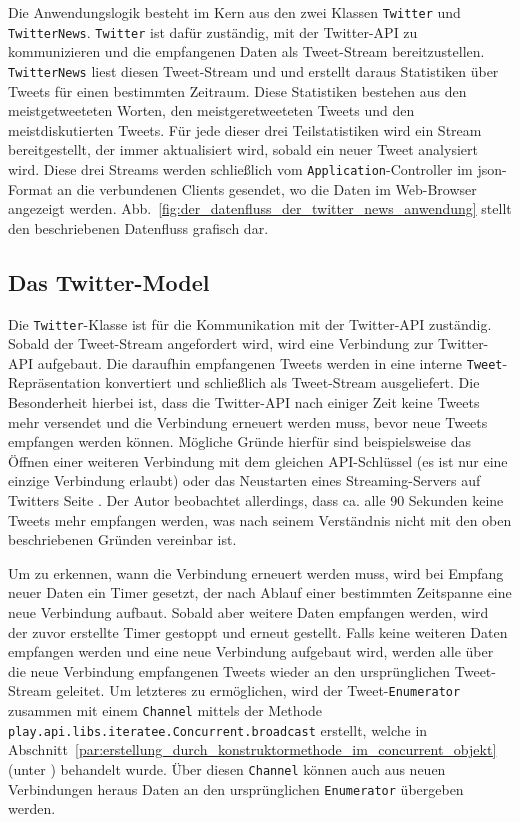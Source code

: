 Die Anwendungslogik besteht im Kern aus den zwei Klassen \lstinline|Twitter| und \lstinline|TwitterNews|.
\lstinline|Twitter| ist dafür zuständig, mit der Twitter-API zu kommunizieren und die empfangenen Daten als Tweet-Stream bereitzustellen.
\lstinline|TwitterNews| liest diesen Tweet-Stream und und erstellt daraus Statistiken über Tweets für einen bestimmten Zeitraum.
Diese Statistiken bestehen aus den meistgetweeteten Worten, den meistgeretweeteten Tweets und den meistdiskutierten Tweets.
Für jede dieser drei Teilstatistiken wird ein Stream bereitgestellt, der immer aktualisiert wird, sobald ein neuer Tweet analysiert wird.
Diese drei Streams werden schließlich vom \lstinline|Application|-Controller im \gls{json}-Format an die verbundenen Clients gesendet, wo die Daten im Web-Browser angezeigt werden.
Abb.~\ref{fig:der_datenfluss_der_twitter_news_anwendung} stellt den beschriebenen Datenfluss grafisch dar.


\subsection{Das Twitter-Model} %
\label{sub:die_twitter_klasse}

Die \lstinline|Twitter|-Klasse ist für die Kommunikation mit der Twitter-API zuständig.
Sobald der Tweet-Stream angefordert wird, wird eine Verbindung zur Twitter-API aufgebaut.
Die daraufhin empfangenen Tweets werden in eine interne \lstinline|Tweet|-Repräsentation konvertiert und schließlich als Tweet-Stream ausgeliefert.
Die Besonderheit hierbei ist, dass die Twitter-API nach einiger Zeit keine Tweets mehr versendet und die Verbindung erneuert werden muss, bevor neue Tweets empfangen werden können.
Mögliche Gründe hierfür sind beispielsweise das Öffnen einer weiteren Verbindung mit dem gleichen API-Schlüssel (es ist nur eine einzige Verbindung erlaubt) oder das Neustarten eines Streaming-Servers auf Twitters Seite \cite[vgl.][]{twitter_connecting_to_streaming_endpoint}.
Der Autor beobachtet allerdings, dass ca. alle 90 Sekunden keine Tweets mehr empfangen werden, was nach seinem Verständnis nicht mit den oben beschriebenen Gründen vereinbar ist.

Um zu erkennen, wann die Verbindung erneuert werden muss, wird bei Empfang neuer Daten ein Timer gesetzt, der nach Ablauf einer bestimmten Zeitspanne eine neue Verbindung aufbaut.
Sobald aber weitere Daten empfangen werden, wird der zuvor erstellte Timer gestoppt und erneut gestellt.
Falls keine weiteren Daten empfangen werden und eine neue Verbindung aufgebaut wird, werden alle über die neue Verbindung empfangenen Tweets wieder an den ursprünglichen Tweet-Stream geleitet.
Um letzteres zu ermöglichen, wird der Tweet-\lstinline|Enumerator| zusammen mit einem \lstinline|Channel| mittels der Methode \lstinline|play.api.libs.iteratee.Concurrent.broadcast| erstellt, welche in Abschnitt~\ref{par:erstellung_durch_konstruktormethode_im_concurrent_objekt} (unter ) behandelt wurde.
Über diesen \lstinline|Channel| können auch aus neuen Verbindungen heraus Daten an den ursprünglichen \lstinline|Enumerator| übergeben werden.

